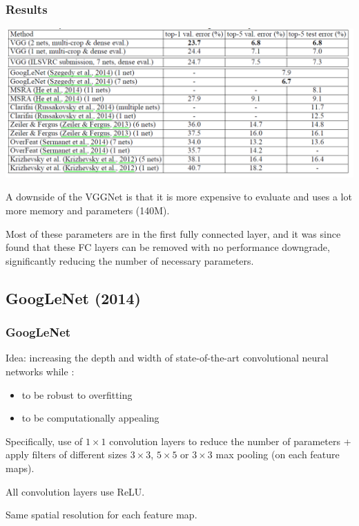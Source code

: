 \begin{frame}
	\frametitle{Results}

\begin{center}
	\includegraphics[scale=0.6]{figs/results_VGG}
\end{center}


	A downside of the VGGNet is that it is more expensive to evaluate and uses a lot more memory and parameters (140M).

	Most of these parameters are in the first fully connected layer, and it was since found that these FC layers can be removed with no performance downgrade, significantly reducing the number of necessary parameters.

\end{frame}


\subsection{GoogLeNet (2014)}

\begin{frame}
	\frametitle{GoogLeNet}


	\bigskip

	Idea: increasing the depth and width of state-of-the-art convolutional neural networks while :
	\begin{itemize}
		\item to be robust to overfitting

		\smallskip
		\item to be computationally appealing
	\end{itemize}

	\bigskip

	Specifically, use of $1\times 1$ convolution layers to reduce the number of parameters + apply filters of different sizes $3 \times 3$, $5 \times 5$ or $3 \times 3$ max pooling (on each feature maps).

\bigskip

All convolution layers use ReLU.

\bigskip

Same spatial resolution for each feature map.


\end{frame}


